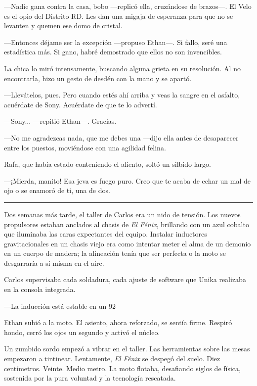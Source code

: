 \documentclass[12pt,a4paper]{book}
\begin{document}
---Nadie gana contra la casa, bobo ---replicó ella, cruzándose de brazos---. El Velo es el opio del Distrito RD. Les dan una migaja de esperanza para que no se levanten y quemen ese domo de cristal.

---Entonces déjame ser la excepción ---propuso Ethan---. Si fallo, seré una estadística más. Si gano, habré demostrado que ellos no son invencibles.

La chica lo miró intensamente, buscando alguna grieta en su resolución. Al no encontrarla, hizo un gesto de desdén con la mano y se apartó.

---Llevátelos, pues. Pero cuando estés ahí arriba y veas la sangre en el asfalto, acuérdate de Sony. Acuérdate de que te lo advertí.

---Sony... ---repitió Ethan---. Gracias.

---No me agradezcas nada, que me debes una ---dijo ella antes de desaparecer entre los puestos, moviéndose con una agilidad felina.

Rafa, que había estado conteniendo el aliento, soltó un silbido largo.

---¡Mierda, manito! Esa jeva es fuego puro. Creo que te acaba de echar un mal de ojo o se enamoró de ti, una de dos.

\bigskip
\noindent\rule{\textwidth}{0.4pt}
\bigskip

Dos semanas más tarde, el taller de Carlos era un nido de tensión. Los nuevos propulsores estaban anclados al chasis de \textit{El Fénix}, brillando con un azul cobalto que iluminaba las caras expectantes del equipo. Instalar inductores gravitacionales en un chasis viejo era como intentar meter el alma de un demonio en un cuerpo de madera; la alineación tenía que ser perfecta o la moto se desgarraría a sí misma en el aire.

Carlos supervisaba cada soldadura, cada ajuste de software que Unika realizaba en la consola integrada.

---La inducción está estable en un 92%

Ethan subió a la moto. El asiento, ahora reforzado, se sentía firme. Respiró hondo, cerró los ojos un segundo y activó el núcleo.

Un zumbido sordo empezó a vibrar en el taller. Las herramientas sobre las mesas empezaron a tintinear. Lentamente, \textit{El Fénix} se despegó del suelo. Diez centímetros. Veinte. Medio metro. La moto flotaba, desafiando siglos de física, sostenida por la pura voluntad y la tecnología rescatada.
\end{document}
